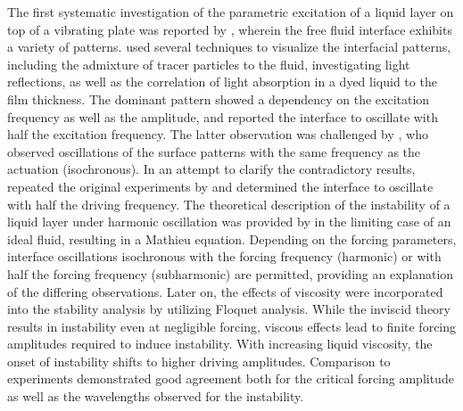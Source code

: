 \documentclass{jfm_arxiv}
\begin{document}
The first systematic investigation of the parametric excitation of a liquid layer on top of a vibrating plate was reported by \citet{Faraday1831}, wherein the free fluid interface exhibits a variety of patterns.
\citeauthor{Faraday1831} used several techniques to visualize the interfacial patterns, including the admixture of tracer particles to the fluid, investigating light reflections, as well as the correlation of light absorption in a dyed liquid to the film thickness.
The dominant pattern showed a dependency on the excitation frequency as well as the amplitude, and \citeauthor{Faraday1831} reported the interface to oscillate with half the excitation frequency. 
The latter observation was challenged by \citet{Matthiessen1868, Matthiessen1870}, who observed oscillations of the surface patterns with the same frequency as the actuation (isochronous).
In an attempt to clarify the contradictory results, \citet{Rayleigh1883} repeated the original experiments by \citeauthor{Faraday1831} and determined the interface to oscillate with half the driving frequency.
The theoretical description of the instability of a liquid layer under harmonic oscillation was provided by \citet{Benjamin1954} in the limiting case of an ideal fluid, resulting in a Mathieu equation. Depending on the forcing parameters, interface oscillations isochronous with the forcing frequency (harmonic) or with half the forcing frequency (subharmonic) are permitted, providing an explanation of the differing observations. 
Later on, the effects of viscosity were incorporated into the stability analysis by \citet{Kumar1994} utilizing Floquet analysis. While the inviscid theory results in instability even at negligible forcing, viscous effects lead to finite forcing amplitudes required to induce instability. With increasing liquid viscosity, the onset of instability shifts to higher driving amplitudes. 
Comparison to experiments demonstrated good agreement both for the critical forcing amplitude as well as the wavelengths observed for the instability. 
\end{document}
